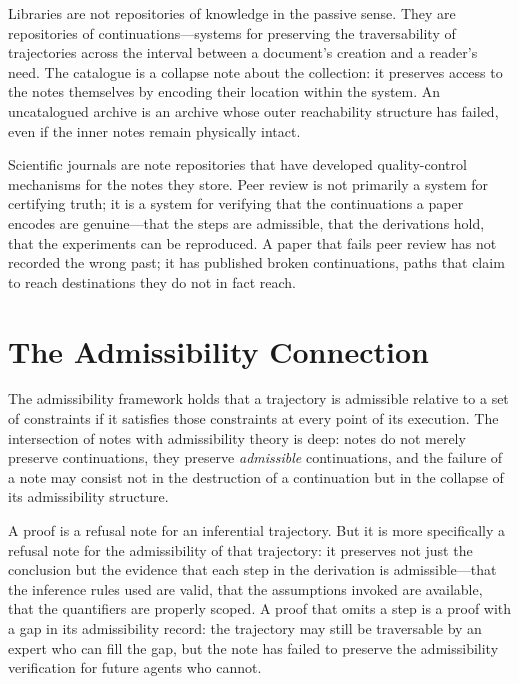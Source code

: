 \documentclass[12pt, a4paper]{article}
\theoremstyle{plain}
\theoremstyle{definition}
\theoremstyle{remark}
\begin{document}
Libraries are not repositories of knowledge in the passive sense. They are
repositories of continuations---systems for preserving the traversability of
trajectories across the interval between a document's creation and a reader's
need. The catalogue is a collapse note about the collection: it preserves access
to the notes themselves by encoding their location within the system. An
uncatalogued archive is an archive whose outer reachability structure has failed,
even if the inner notes remain physically intact.

Scientific journals are note repositories that have developed quality-control
mechanisms for the notes they store. Peer review is not primarily a system for
certifying truth; it is a system for verifying that the continuations a paper
encodes are genuine---that the steps are admissible, that the derivations hold,
that the experiments can be reproduced. A paper that fails peer review has not
recorded the wrong past; it has published broken continuations, paths that claim
to reach destinations they do not in fact reach.

\section{The Admissibility Connection}

The admissibility framework holds that a trajectory is admissible relative to a
set of constraints if it satisfies those constraints at every point of its
execution. The intersection of notes with admissibility theory is deep: notes do
not merely preserve continuations, they preserve \emph{admissible} continuations,
and the failure of a note may consist not in the destruction of a continuation but
in the collapse of its admissibility structure.

A proof is a refusal note for an inferential trajectory. But it is more
specifically a refusal note for the admissibility of that trajectory: it preserves
not just the conclusion but the evidence that each step in the derivation is
admissible---that the inference rules used are valid, that the assumptions invoked
are available, that the quantifiers are properly scoped. A proof that omits a step
is a proof with a gap in its admissibility record: the trajectory may still be
traversable by an expert who can fill the gap, but the note has failed to preserve
the admissibility verification for future agents who cannot.
\end{document}
